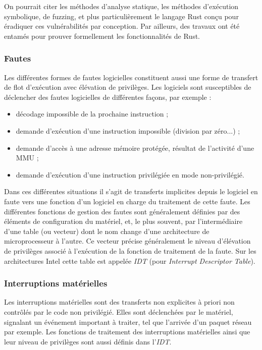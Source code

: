 On pourrait citer les méthodes d’analyse statique, les méthodes d’exécution symbolique, de fuzzing, et plus particulièrement le langage Rust conçu pour éradiquer ces vulnérabilités par conception. Par ailleurs, des travaux ont été entamés pour prouver formellement les fonctionnalités de Rust.


			\subsubsection{Fautes}

Les différentes formes de fautes logicielles constituent aussi une forme de transfert de flot d'exécution avec élévation de privilèges. Les logiciels sont susceptibles de déclencher des fautes logicielles de différentes façons, par exemple :
\begin{itemize}
  \item décodage impossible de la prochaine instruction ;
  \item demande d'exécution d'une instruction impossible (division par zéro...) ; 
  \item demande d'accès à une adresse mémoire protégée, résultat de l'activité d'une MMU ;  
  \item demande d'exécution d'une instruction privilégiée en mode non-privilégié.
\end{itemize}
Dans ces différentes situations il s'agit de transferts implicites depuis le logiciel en faute vers une fonction d'un logiciel en charge du traitement de cette faute. Les différentes fonctions de gestion des fautes sont généralement définies par des éléments de configuration du matériel, et, le plus souvent, par l'intermédiaire d'une table (ou vecteur) dont le nom change d'une architecture de microprocesseur à l'autre. Ce vecteur précise généralement le niveau d'élévation de privilèges associé à l'exécution de la fonction de traitement de la faute. Sur les architectures Intel cette table est appelée \emph{IDT} (pour \emph{Interrupt Descriptor Table}).

\subsubsection{Interruptions matérielles}
Les interruptions matérielles sont des transferts non explicites à priori non contrôlés par le code non privilégié. Elles sont déclenchées par le matériel, signalant un événement important à traiter, tel que l'arrivée d'un paquet réseau par exemple. Les fonctions de traitement des interruptions matérielles ainsi que leur niveau de privilèges sont aussi définis dans l'\emph{IDT}.

